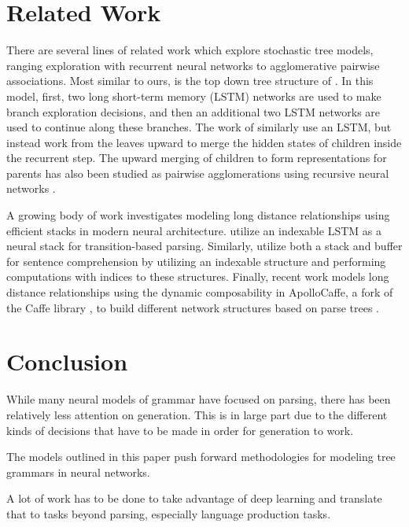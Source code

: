 \documentclass[11pt]{article}
\begin{document}
\section{Related Work}
\label{sec:relatedwork}

There are several lines of related work which explore stochastic tree models, ranging exploration with recurrent neural networks to agglomerative pairwise associations. 
%
Most similar to ours, is the top down tree structure of .
%
In this model, first, two long short-term memory (LSTM) networks are used to make branch exploration decisions, and then an additional two LSTM networks are used to continue along these branches. 
%
The work of  similarly use an LSTM, but instead work from the leaves upward to merge the hidden states of children inside the recurrent step. 
%
The upward merging of children to form representations for parents has also been studied as pairwise agglomerations using recursive neural networks \cite{Socher2010}.

A growing body of work investigates modeling long distance relationships using efficient stacks in modern neural architecture. 
%
 utilize an indexable LSTM as a neural stack for transition-based parsing.  
%
Similarly,  utilize both a stack and buffer for sentence comprehension by utilizing an indexable structure and performing computations with indices to these structures. 
%
Finally, recent work models long distance relationships using the dynamic composability in ApolloCaffe, a fork of the Caffe library \cite{jia2014caffe}, to build different network structures based on parse trees \cite{Andreas2016LearningTC}.

\section{Conclusion}
\label{sec:conclusion}

While many neural models of grammar have focused on parsing, there has been relatively less attention on generation.
%
This is in large part due to the different kinds of decisions that have to be made in order for generation to work. 


The models outlined in this paper push forward methodologies for modeling tree grammars in neural networks. 


A lot of work has to be done to take advantage of deep learning and translate that to tasks beyond parsing, especially language production tasks.
\end{document}
